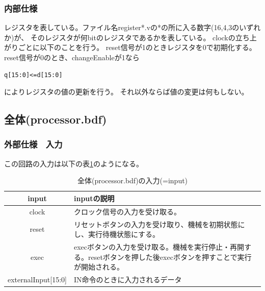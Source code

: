 \documentclass[a4j,titlepage]{jarticle}
\begin{document}
\subsubsection{内部仕様}
レジスタを表している。ファイル名register*.vの*の所に入る数字(16,4,3のいずれか)が、
そのレジスタが何bitのレジスタであるかを表している。
clockの立ち上がりごとに以下のことを行う。
reset信号が1のときレジスタを0で初期化する。
reset信号が0のとき、changeEnableが1なら\begin{verbatim}q[15:0]<=d[15:0]\end{verbatim}によりレジスタの値の更新を行う。
それ以外ならば値の変更は何もしない。


\newpage
\subsection{全体(processor.bdf)}

\subsubsection{外部仕様　入力}
この回路の入力は以下の表\ref{zentaiprocessorI}のようになる。
\begin{table}[H]
    \caption{全体(processor.bdf)の入力(=input)}
    \label{zentaiprocessorI}
    \begin{center}
    \begin {tabularx}{150mm}{|c|X|} \hline
         input & inputの説明 \\ \hline \hline
         clock & クロック信号の入力を受け取る。 \\ \hline
         reset & リセットボタンの入力を受け取り、機械を初期状態にし、実行待機状態にする。\\ \hline %
         exec & execボタンの入力を受け取る。機械を実行停止・再開する。resetボタンを押した後execボタンを押すことで実行が開始される。\\ \hline
         externalInput[15:0] & IN命令のときに入力されるデータ\\ \hline
    \end{tabularx}
    \end{center}
\end{table}
\end{document}
